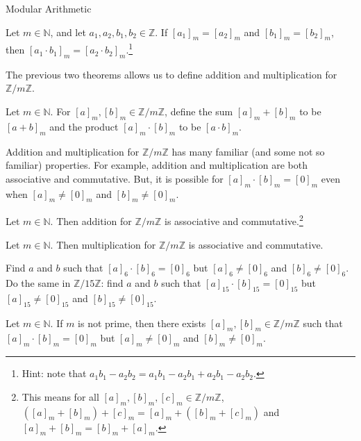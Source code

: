 \begin{section}{Modular Arithmetic}
\begin{theorem}
Let $m\in \mathbb{N}$, and let $a_1,a_2,b_1,b_2 \in \mathbb{Z}$. If $[a_1]_m = [a_2]_m$ and $[b_1]_m = [b_2]_m$, then $[a_1\cdot b_1]_m = [a_2\cdot b_2]_m$.\footnote{Hint: note that $a_1b_1-a_2b_2 = a_1b_1 -a_2b_1 + a_2b_1-a_2b_2$.}
\end{theorem}

The previous two theorems allows us to define addition and multiplication for $\mathbb{Z}/m\mathbb{Z}$. 

\begin{definition}
Let $m\in \mathbb{N}$. For $[a]_m, [b]_m \in \mathbb{Z}/m\mathbb{Z}$, define the sum $[a]_m + [b]_m$ to be $[a+b]_m$ and the product $[a]_m \cdot [b]_m$ to be $ [a\cdot b]_m$.
\end{definition}

\begin{remark}
Addition and multiplication for $\mathbb{Z}/m\mathbb{Z}$ has many familiar (and some not so familiar) properties. For example, addition and multiplication are both associative and commutative. But, it is possible for $[a]_m\cdot[b]_m = [0]_m$ even when $[a]_m \neq [0]_m$ and $[b]_m \neq [0]_m$.
\end{remark}

\begin{theorem}
Let $m\in \mathbb{N}$. Then addition for $\mathbb{Z}/m\mathbb{Z}$ is associative and commutative.\footnote{This means for all $[a]_m, [b]_m, [c]_m \in \mathbb{Z}/m\mathbb{Z}$, $([a]_m + [b]_m) + [c]_m = [a]_m + ([b]_m + [c]_m)$ and $[a]_m + [b]_m = [b]_m + [a]_m$.}
\end{theorem}

\begin{theorem}
Let $m\in \mathbb{N}$. Then multiplication for $\mathbb{Z}/m\mathbb{Z}$ is associative and commutative.
\end{theorem}

\begin{exercise}
Find $a$ and $b$ such that $[a]_6\cdot[b]_6 = [0]_6$ but $[a]_6 \neq [0]_6$ and $[b]_6 \neq [0]_6$. Do the same in $\mathbb{Z}/15\mathbb{Z}$: find $a$ and $b$ such that $[a]_{15}\cdot[b]_{15} = [0]_{15}$ but $[a]_{15} \neq [0]_{15}$ and $[b]_{15} \neq [0]_{15}$.
\end{exercise}

\begin{theorem}
Let $m\in \mathbb{N}$. If $m$ is not prime, then there exists $[a]_m, [b]_m \in \mathbb{Z}/m\mathbb{Z}$ such that $[a]_m\cdot[b]_m = [0]_m$ but $[a]_m \neq [0]_m$ and $[b]_m \neq [0]_m$.
\end{theorem}


\end{section}
